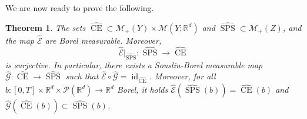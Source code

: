 \documentclass[10pt,leqno]{amsart}
\numberwithin{equation}{section}
\newtheorem{teorema}{Theorem}[section]
\newcommand{\R}{\mathbb{R}}
\newcommand{\PP}{\mathcal{P}}
\newcommand{\CE}{\operatorname{CE}}
\begin{document}
We are now ready to prove the following.


\begin{teorema}\label{lemma: properties of hat mathcal E}
    The sets $\hat{\operatorname{CE}} \subset \mathcal{M}_+(Y)\times \mathcal{M}(Y;\R^d)$ and $\hat{\operatorname{SPS}}\subset \mathcal{M}_+(Z)$, and the map $\hat{\mathcal{E}}$ are Borel measurable. Moreover, 
    \begin{equation}
        \hat{\mathcal{E}} |_{\hat{\operatorname{SPS}}}: \hat{\operatorname{SPS}} \to \hat{\operatorname{CE}}
    \end{equation}
    is surjective. In particular, there exists a Souslin-Borel measurable map $\hat{\mathcal{G}}:\hat{\operatorname{CE}} \to \hat{\operatorname{SPS}}$ such that $\hat{\mathcal{E}} \circ\hat{\mathcal{G}} = \operatorname{id}_{\hat{\operatorname{CE}}}$. 
    Moreover, for all $b:[0,T]\times \R^d \times \PP(\R^d) \to \R^d$ Borel, it holds $\hat{\mathcal{E}}(\hat{\operatorname{SPS}}(b) ) = \hat{\operatorname{CE}}(b) $ and $\hat{\mathcal{G}}(\hat{\CE}(b)) \subset \hat{\operatorname{SPS}}(b)$.
\end{teorema}
\end{document}
